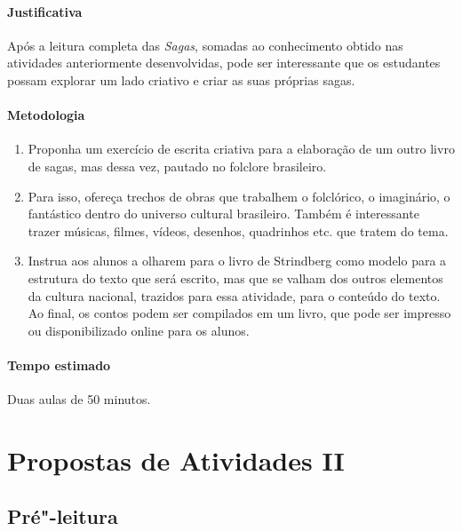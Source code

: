 \documentclass[12pt]{extarticle}
\begin{document}
\paragraph{Justificativa} Após a leitura completa das \emph{Sagas}, somadas ao
conhecimento obtido nas atividades anteriormente desenvolvidas, pode ser interessante 
que os estudantes possam explorar um lado criativo e criar as suas próprias sagas.

\paragraph{Metodologia}

\begin{enumerate}

\item Proponha
um exercício de escrita criativa para a elaboração de um outro livro de
sagas, mas dessa vez, pautado no folclore brasileiro.

\item Para isso, ofereça
trechos de obras que trabalhem o folclórico, o imaginário, o fantástico
dentro do universo cultural brasileiro. Também é interessante trazer
músicas, filmes, vídeos, desenhos, quadrinhos etc. que tratem do tema.

\item Instrua aos alunos a olharem para o livro de Strindberg como modelo para
a estrutura do texto que será escrito, mas que se valham dos outros
elementos da cultura nacional, trazidos para essa atividade, para o
conteúdo do texto. Ao final, os contos podem ser compilados em um livro,
que pode ser impresso ou disponibilizado online para os alunos.

\end{enumerate}

\paragraph{Tempo estimado} Duas aulas de 50 minutos.



\section{Propostas de Atividades II}

\subsection{Pré"-leitura}
\end{document}
